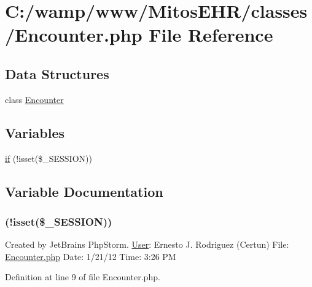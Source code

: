 \hypertarget{_encounter_8php}{\section{\-C\-:/wamp/www/\-Mitos\-E\-H\-R/classes/\-Encounter.php \-File \-Reference}
\label{_encounter_8php}
}
\subsection*{\-Data \-Structures}
\begin{DoxyCompactItemize}
\item 
class \hyperlink{class_encounter}{\-Encounter}
\end{DoxyCompactItemize}
\subsection*{\-Variables}
\begin{DoxyCompactItemize}
\item 
\hyperlink{_encounter_8php_a8ceca98aa29914fd2479a84a8d2242fb}{if} (!isset(\$\-\_\-\-S\-E\-S\-S\-I\-O\-N))
\end{DoxyCompactItemize}


\subsection{\-Variable \-Documentation}
\hypertarget{_encounter_8php_a8ceca98aa29914fd2479a84a8d2242fb}{
\subsubsection[{if}]{(!isset(\$\-\_\-\-S\-E\-S\-S\-I\-O\-N))}}\label{_encounter_8php_a8ceca98aa29914fd2479a84a8d2242fb}
\-Created by \-Jet\-Brains \-Php\-Storm. \hyperlink{class_user}{\-User}\-: \-Ernesto \-J. \-Rodriguez (\-Certun) \-File\-: \hyperlink{_encounter_8php}{\-Encounter.\-php} \-Date\-: 1/21/12 \-Time\-: 3\-:26 \-P\-M 

\-Definition at line 9 of file \-Encounter.\-php.

